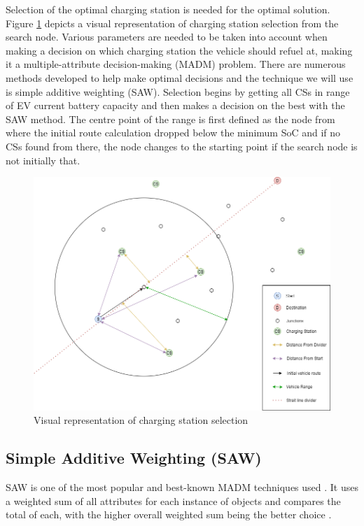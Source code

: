 \documentclass[11pt]{report}
\begin{document}
Selection of the optimal charging station is needed for the optimal solution. Figure \ref{fig:5} depicts a visual representation of charging station selection from the search node. Various parameters are needed to be taken into account when making a decision on which charging station the vehicle should refuel at, making it a multiple-attribute decision-making (MADM) problem. There are numerous methods developed to help make optimal decisions and the technique we will use is simple additive weighting (SAW). Selection begins by getting all CSs in range of EV current battery capacity and then makes a decision on the best with the SAW method. The centre point of the range is first defined as the node from where the initial route calculation dropped below the minimum SoC and if no CSs found from there, the node changes to the starting point if the search node is not initially that.

\begin{figure}[h!]
  \centering
  \includegraphics[width=0.85\linewidth]{CSSelection.png}
  \caption{Visual representation of charging station selection}
  \label{fig:5}
\end{figure}

\subsection{Simple Additive Weighting (SAW)}

SAW is one of the most popular and best-known MADM techniques used \autocite{chakraborty2007simulation}. It uses a weighted sum of all attributes for each instance of objects and compares the total of each, with the higher overall weighted sum being the better choice \autocite{churchman1954approximate}. 
\end{document}
